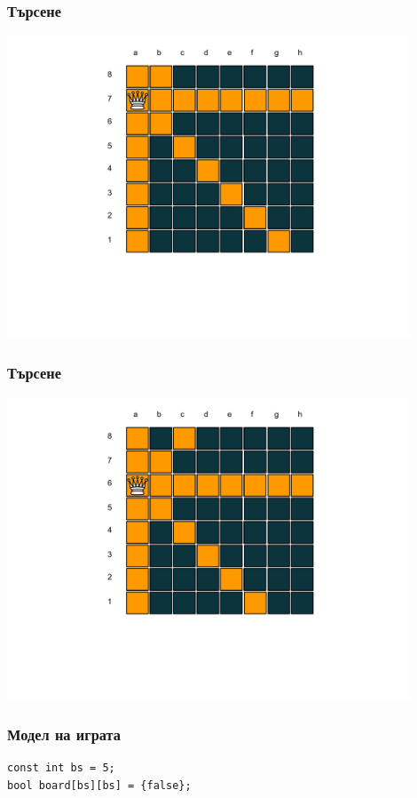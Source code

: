 \documentclass{beamer}
\begin{document}
\begin{frame}[fragile]
\frametitle{Търсене}
\begin{center}
\includegraphics[width=12cm]{images/cb_0102}
\end{center}
\end{frame}


\begin{frame}[fragile]
\frametitle{Търсене}
\begin{center}
\includegraphics[width=12cm]{images/cb_0103}
\end{center}
\end{frame}


\begin{frame}[fragile]
\frametitle{Модел на играта}
\begin{lstlisting}
const int bs = 5;
bool board[bs][bs] = {false};
\end{lstlisting}
\end{frame}
\end{document}
